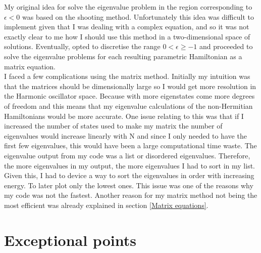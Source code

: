 \documentclass[10pt, a4paper, singlespacing]{report}
\begin{document}
My original idea for solve the eigenvalue problem in the region corresponding to $\epsilon < 0$ was based on the shooting method\cite{N_R}. Unfortunately this idea was difficult to implement given that I was dealing with a complex equation, and so it was not exactly clear to me how I should use this method in a two-dimensional space of solutions. Eventually, opted to discretise the range $0 < \epsilon \geq -1$ and proceeded to solve the eigenvalue problems for each resulting parametric Hamiltonian as a matrix equation.\\
I faced a few complications using the matrix method. Initially my intuition was that the matrices should be dimensionally large so I would get more resolution in the Harmonic oscillator space. Because with more eigenstates come more degrees of freedom and this means that my eigenvalue calculations of the non-Hermitian Hamiltonians would be more accurate. One issue relating to this was that if I increased the number of states used to make my matrix the number of eigenvalues would increase linearly with N and since I only needed to have the first few eigenvalues, this would have been a large computational time waste. The eigenvalue output from my code was a list or disordered eigenvalues. Therefore, the more eigenvalues in my output, the more eigenvalues I had to sort in my list. Given this, I had to device a way to sort the eigenvalues in order with increasing energy. To later plot only the lowest ones. This issue was one of the reasons why my code was not the fastest. Another reason for my matrix method not being the most efficient was already explained in section \ref{Matrix equations}.

\section{Exceptional points}\label{EPs}
\end{document}
